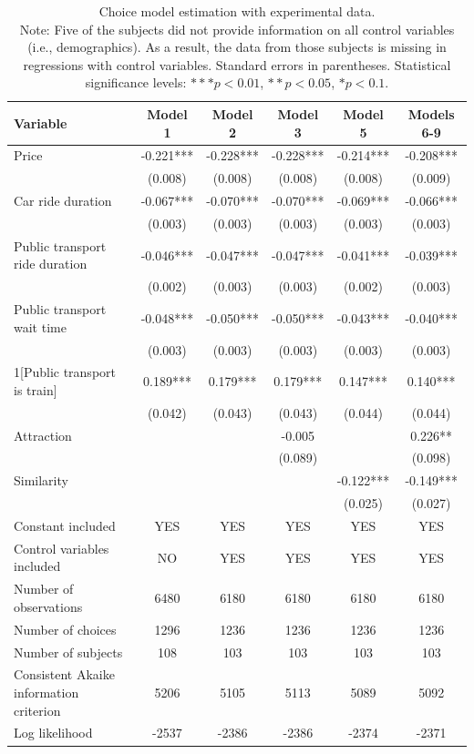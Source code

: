 \documentclass[a4paper,12pt]{article}
\begin{document}
\clearpage
\begin{table}
    \centering
    \begin{tabular}{p{7cm}ccccc}
    \toprule
    Variable & Model 1 & Model 2 & Model 3 & Model 5 & Models 6-9 \\
    \midrule
    Price & -0.221*** & -0.228*** & -0.228*** & -0.214*** & -0.208*** \\
    & (0.008) & (0.008) & (0.008) & (0.008) & (0.009) \\
    Car ride duration & -0.067*** & -0.070*** & -0.070*** & -0.069*** & -0.066*** \\
    & (0.003) & (0.003) & (0.003) & (0.003) & (0.003) \\
    Public transport ride duration & -0.046*** & -0.047*** & -0.047*** & -0.041*** & -0.039*** \\
    & (0.002) & (0.003) & (0.003) & (0.002) & (0.003) \\
    Public transport wait time & -0.048*** & -0.050*** & -0.050*** & -0.043*** & -0.040*** \\
    & (0.003) & (0.003) & (0.003) & (0.003) & (0.003) \\
    1[Public transport is train] & 0.189*** & 0.179*** & 0.179*** & 0.147*** & 0.140*** \\
    & (0.042) & (0.043) & (0.043) & (0.044) & (0.044) \\
    Attraction & & & -0.005 & & 0.226** \\
    & & & (0.089) & & (0.098) \\
    Similarity & & & & -0.122*** & -0.149*** \\
    & & & & (0.025) & (0.027) \\
    Constant included & YES & YES & YES & YES & YES \\
    Control variables included & NO & YES & YES & YES & YES \\
    Number of observations & 6480 & 6180 & 6180 & 6180 & 6180 \\
    Number of choices & 1296 & 1236 & 1236 & 1236 & 1236 \\
    Number of subjects & 108 & 103 & 103 & 103 & 103 \\
    Consistent Akaike information criterion & 5206 & 5105 & 5113 & 5089 & 5092 \\
    Log likelihood & -2537 & -2386 & -2386 & -2374 & -2371 \\
    \bottomrule
    \end{tabular}
    \caption{Choice model estimation with experimental data. \\
    Note: Five of the subjects did not provide information on all control variables (i.e., demographics). As a result, the data from those subjects is missing in regressions with control variables. Standard errors in parentheses. Statistical significance levels: $*** p<0.01$, $** p<0.05$, $* p<0.1$.}
    \label{tab:nejcModelResults}
\end{table}
\end{document}
